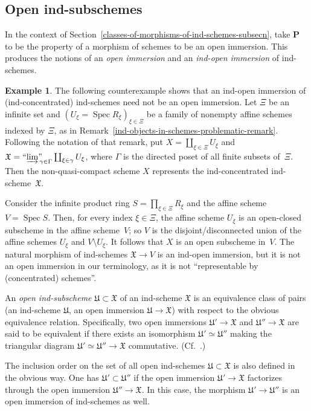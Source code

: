 \documentclass[12pt,a4paper]{amsart}
\newcommand{\+}{\protect\nobreakdash-}
\renewcommand{\:}{\colon}
\newcommand{\rarrow}{\longrightarrow}
\DeclareMathOperator{\Spec}{Spec}
\newcommand{\ilim}
 {\mathop{\text{\normalfont``$\varinjlim$''\!\!}}\nolimits}
\newcommand{\bP}{\mathbf P}
\newcommand{\fX}{\mathfrak X}
\newcommand{\fU}{\mathfrak U}
\theoremstyle{plain}
\theoremstyle{definition}
\newtheorem{ex}[thm]{Example}
\begin{document}
\subsection{Open ind-subschemes}
 In the context of
Section~\ref{classes-of-morphisms-of-ind-schemes-subsecn},
take $\bP$ to be the property of a morphism of schemes to be
an open immersion.
 This produces the notions of an \emph{open immersion} and
an \emph{ind-open immersion} of ind-schemes.

\begin{ex} \label{ind-open-but-not-open-immersion-counterex}
 The following counterexample shows that an ind-open immersion
of (ind-concentrated) ind-schemes need not be an open immersion.
 Let $\Xi$ be an infinite set and $(U_\xi=\Spec R_\xi)_{\xi\in\Xi}$
be a family of nonempty affine schemes indexed by $\Xi$, as in
Remark~\ref{ind-objects-in-schemes-problematic-remark}.
 Following the notation of that remark, put
$X=\coprod_{\xi\in\Xi}U_\xi$ and $\fX=\ilim_{\gamma\in\Gamma}
\coprod_{\xi\in\gamma}U_\xi$, where $\Gamma$ is the directed poset
of all finite subsets of~$\Xi$.
 Then the non-quasi-compact scheme $X$ represents the ind-concentrated
ind-scheme~$\fX$.

 Consider the infinite product ring $S=\prod_{\xi\in\Xi}R_\xi$ and
the affine scheme $V=\Spec S$.
 Then, for every index $\xi\in\Xi$, the affine scheme $U_\xi$ is
an open-closed subscheme in the affine scheme~$V$; so $V$ is
the disjoint/disconnected union of the affine schemes $U_\xi$ and
$V\setminus U_\xi$.
 It follows that $X$ is an open subscheme in~$V$.
 The natural morphism of ind-schemes $\fX\rarrow V$ is an ind-open
immersion, but it is not an open immersion in our terminology, as it is
not ``representable by (concentrated) schemes''.
\end{ex}

 An \emph{open ind-subscheme} $\fU\subset\fX$ of an ind-scheme $\fX$ is
an equivalence class of pairs (an ind-scheme $\fU$, an open
immersion $\fU\rarrow\fX$) with respect to the obvious equivalence
relation.
 Specifically, two open immersions $\fU'\rarrow\fX$ and
$\fU''\rarrow\fX$ are said to be equivalent if there exists
an isomorphism $\fU'\simeq\fU''$ making the triangular diagram
$\fU'\simeq\fU''\rarrow\fX$ commutative.
 (Cf.~\cite[Definition~1.13]{Rich}.)

 The inclusion order on the set of all open ind-schemes $\fU\subset\fX$
is also defined in the obvious way.
 One has $\fU'\subset\fU''$ if the open immersion $\fU'\rarrow\fX$
factorizes through the open immersion $\fU''\rarrow\fX$.
 In this case, the morphism $\fU'\rarrow\fU''$ is an open immersion
of ind-schemes as well.
\end{document}
